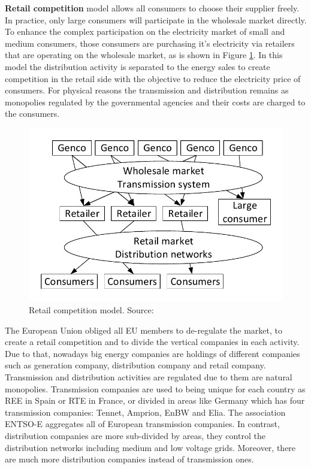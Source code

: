 \documentclass[a4paper,11pt,twoside,openright]{report}
\begin{document}
\textbf{Retail competition} model allows all consumers to choose their supplier freely. In practice, only large consumers will participate in the wholesale market directly. To enhance the complex participation on the electricity market of small and medium consumers, those consumers are purchasing it's electricity via retailers that are operating on the wholesale market, as is shown in Figure \ref{fig:retail}. In this model the distribution activity is separated to the energy sales to create competition in the retail side with the objective to reduce the electricity price of consumers. For physical reasons the transmission and distribution remains as monopolies regulated by the governmental agencies and their costs are charged to the consumers.

\begin{figure}[h!]
	\centering
	\includegraphics[scale=0.7]{Visios/Market_competition_Retail_competition}
	\caption{Retail competition  model. Source: \cite{Economics_Kirschen}}
	\label{fig:retail}
\end{figure}

The European Union obliged all EU members to de-regulate the market, to create a retail competition and to divide the vertical companies in each activity. Due to that, nowadays big energy companies are holdings of different companies such as generation company, distribution company and retail company. Transmission and distribution activities are regulated due to them are natural monopolies. 
Transmission companies are used to being unique for each country as REE in Spain or RTE in France, or divided in areas like Germany which has four transmission companies: Tennet, Amprion, EnBW and Elia. The association ENTSO-E aggregates all of European transmission companies. 
In contrast, distribution companies are more sub-divided by areas, they control the distribution networks including medium and low voltage grids. Moreover, there are much more distribution companies instead of transmission ones.
\end{document}
